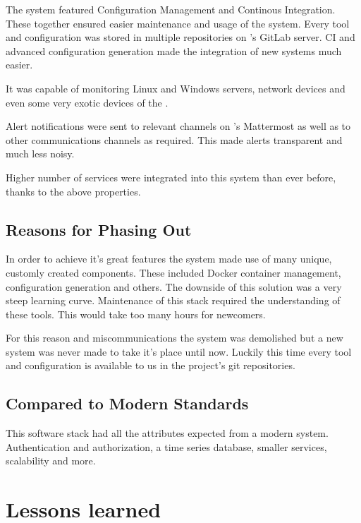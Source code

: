 The system featured Configuration Management and Continous Integration. These
together ensured easier maintenance and usage of the system. Every tool and
configuration was stored in multiple repositories on \kszk's GitLab server. CI
and advanced configuration generation made the integration of new systems much
easier.

It was capable of monitoring Linux and Windows servers, network devices and
even some very exotic devices of the \sch.

Alert notifications were sent to relevant channels on \kszk's Mattermost as
well as to other communications channels as required. This made alerts
transparent and much less noisy.

Higher number of services were integrated into this system than ever before,
thanks to the above properties.

\subsection{Reasons for Phasing Out}

In order to achieve it's great features the system made use of many unique,
customly created components. These included Docker container management,
configuration generation and others. The downside of this solution was a very
steep learning curve. Maintenance of this stack required the understanding of
these tools. This would take too many hours for newcomers.

For this reason and miscommunications the system was demolished but a new
system was never made to take it's place until now. Luckily this time every
tool and configuration is available to us in the project's git repositories.

\subsection{Compared to Modern Standards}

This software stack had all the attributes expected from a modern system.
Authentication and authorization, a time series database, smaller services,
scalability and more.

\section{Lessons learned}

